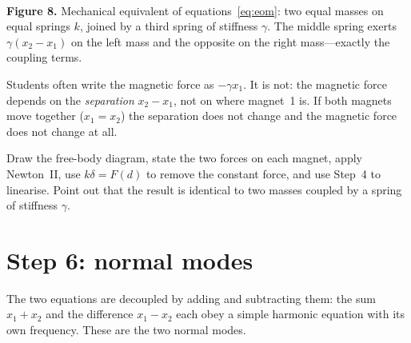 \documentclass[11pt,a4paper]{article}
\begin{document}
\begin{center}
\\[2pt]
{\small\textbf{Figure 8.} Mechanical equivalent of equations~\eqref{eq:eom}: two equal masses on equal springs $k$, joined by a third spring of stiffness $\gamma$. The middle spring exerts $\gamma(x_2-x_1)$ on the left mass and the opposite on the right mass---exactly the coupling terms.}
\end{center}

\begin{pitfall}
Students often write the magnetic force as $-\gamma x_1$. It is not: the magnetic force depends on the \emph{separation} $x_2-x_1$, not on where magnet~1 is. If both magnets move together ($x_1=x_2$) the separation does not change and the magnetic force does not change at all.
\end{pitfall}

\begin{ownwords}
Draw the free-body diagram, state the two forces on each magnet, apply Newton~II, use $k\delta=F(d)$ to remove the constant force, and use Step~4 to linearise. Point out that the result is identical to two masses coupled by a spring of stiffness $\gamma$.
\end{ownwords}

\bigskip
\section{Step 6: normal modes}

\begin{idea}
The two equations are decoupled by adding and subtracting them: the sum $x_1+x_2$ and the difference $x_1-x_2$ each obey a simple harmonic equation with its own frequency. These are the two normal modes.
\end{idea}
\end{document}
